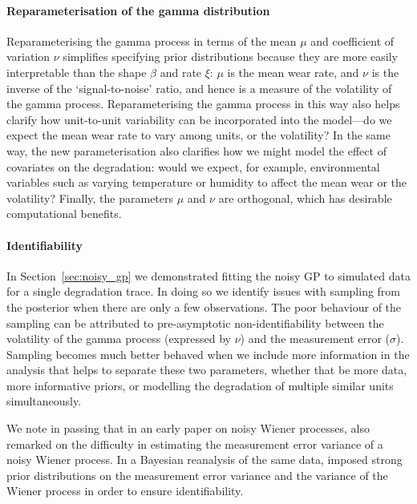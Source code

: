 \documentclass{article}
\begin{document}
\paragraph*{Reparameterisation of the gamma distribution} Reparameterising the gamma process in terms of the mean $\mu$ and coefficient of variation $\nu$ simplifies specifying prior distributions because they are more easily interpretable than the shape $\beta$ and rate $\xi$: $\mu$ is the mean wear rate, and $\nu$ is the inverse of the `signal-to-noise' ratio, and hence is a measure of the volatility of the gamma process.  Reparameterising the gamma process in this way also helps clarify how unit-to-unit variability can be incorporated into the model---do we expect the mean wear rate to vary among units, or the volatility? In the same way, the new parameterisation also clarifies how we might model the effect of covariates on the degradation: would we expect, for example, environmental variables such as varying temperature or humidity to affect the mean wear or the volatility? Finally, the parameters $\mu$ and $\nu$ are orthogonal, which has desirable computational benefits.

\paragraph*{Identifiability} In Section~\ref{sec:noisy_gp} we demonstrated fitting the noisy GP to simulated data for a single degradation trace. In doing so we identify issues with sampling from the posterior when there are only a few observations. The poor behaviour of the sampling can be attributed to pre-asymptotic non-identifiability between the volatility of the gamma process (expressed by $\nu$) and the measurement error ($\sigma$). Sampling becomes much better behaved when we include more information in the analysis that helps to separate these two parameters, whether that be more data, more informative priors, or modelling the degradation of multiple similar units simultaneously.

We note in passing that in an early paper on noisy Wiener processes, \citet{whitmore_1995} also remarked on the difficulty in estimating the measurement error variance of a noisy Wiener process. In a Bayesian reanalysis of the same data, \citet{hamada_2008} imposed strong prior distributions on the measurement error variance and the variance of the Wiener process in order to ensure identifiability.
\end{document}

